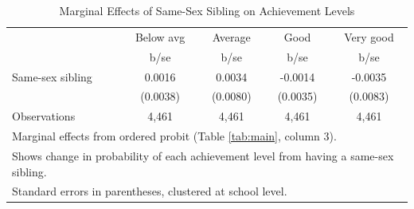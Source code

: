 \documentclass[12pt]{article}
\begin{document}
\begin{table}[htbp]\centering
\def\sym#1{\ifmmode^{#1}\else\(^{#1}\)\fi}
\caption{Marginal Effects of Same-Sex Sibling on Achievement Levels\label{tab:margins}}
\begin{tabular}{l*{4}{c}}
\toprule
                &\multicolumn{1}{c}{Below avg}&\multicolumn{1}{c}{Average}&\multicolumn{1}{c}{Good}&\multicolumn{1}{c}{Very good}\\
                &     b/se         &     b/se         &     b/se         &     b/se         \\
\midrule
Same-sex sibling&   0.0016         &   0.0034         &  -0.0014         &  -0.0035         \\
                & (0.0038)         & (0.0080)         & (0.0035)         & (0.0083)         \\
\midrule
Observations    &    4,461         &    4,461         &    4,461         &    4,461         \\
\bottomrule
\multicolumn{5}{l}{\footnotesize Marginal effects from ordered probit (Table \ref{tab:main}, column 3).}\\
\multicolumn{5}{l}{\footnotesize Shows change in probability of each achievement level from having a same-sex sibling.}\\
\multicolumn{5}{l}{\footnotesize Standard errors in parentheses, clustered at school level.}\\
\end{tabular}
\end{table}
\end{document}
